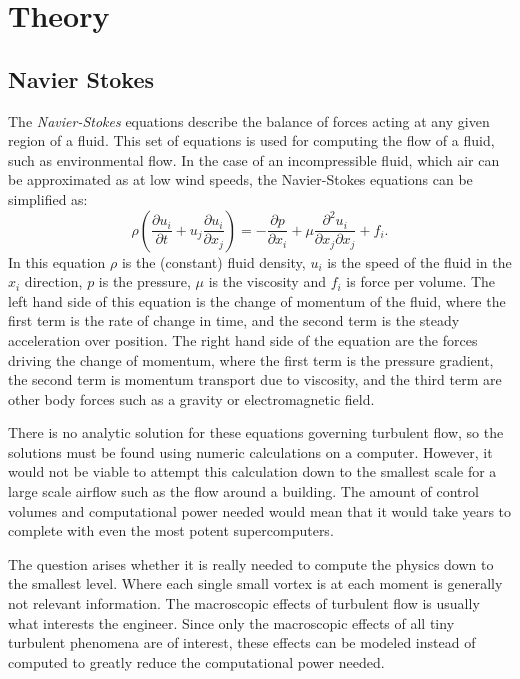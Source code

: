 \section{Theory}
\label{theory}


\subsection{Navier Stokes}

The \emph{Navier-Stokes} equations describe the balance of forces acting at any given region of a fluid. This set of equations is used for computing the flow of a fluid, such as environmental flow. In the case of an incompressible fluid, which air can be approximated as at low wind speeds, the Navier-Stokes equations can be simplified as:
\begin{equation}\label{eq:NS}
\rho \left( \frac{\partial u_i}{\partial t} + u_j \frac{\partial u_i}{\partial x_j} \right) = -\frac{\partial p}{\partial x_i} + \mu \frac{\partial^2 u_i}{\partial x_j \partial x_j} + f_i. 
\end{equation} 
In this equation $\rho$ is the (constant) fluid density, $u_i$ is the speed of the fluid in the $x_i$ direction, $p$ is the pressure, $\mu$ is the viscosity and $f_i$ is force per volume. The left hand side of this equation is the change of momentum of the fluid, where the first term is the rate of change in time, and the second term is the steady acceleration over position. The right hand side of the equation are the forces driving the change of momentum, where the first term is the pressure gradient, the second term is momentum transport due to viscosity, and the third term are other body forces such as a gravity or electromagnetic field.

There is no analytic solution for these equations governing turbulent flow, so the solutions must be found using numeric calculations on a computer. However, it would not be viable to attempt this calculation down to the smallest scale for a large scale airflow such as the flow around a building. The amount of control volumes and computational power needed would mean that it would take years to complete with even the most potent supercomputers. 

The question arises whether it is really needed to compute the physics down to the smallest level. Where each single small vortex is at each moment is generally not relevant information. The macroscopic effects of turbulent flow is usually what interests the engineer. Since only the macroscopic effects of all tiny turbulent phenomena are of interest, these effects can be modeled instead of computed to greatly reduce the computational power needed. 

